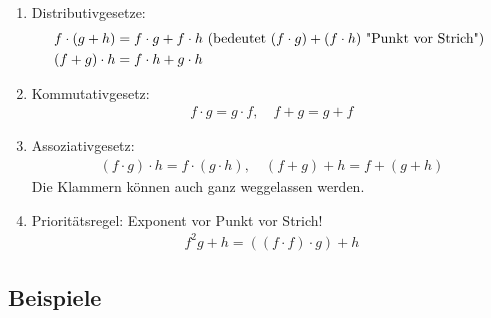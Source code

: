 	\begin{enumerate}
	\item Distributivgesetze:
		\begin{align*}
		f \cdot(g+h)&=f \cdot g + f \cdot h 
		\textnormal{ (bedeutet } (f \cdot g)+(f \cdot h) \textnormal{ "Punkt vor Strich") } \\
		(f+g)\cdot h &= f \cdot h + g \cdot h
		\end{align*}
	
	\item Kommutativgesetz:
		\begin{align*}
		f \cdot g = g \cdot f,\quad f+g=g+f
		\end{align*}
	\item Assoziativgesetz:
		\begin{align*}
		(f \cdot g) \cdot h = f \cdot (g  \cdot h), \quad (f+g)+h=f+(g+h)		
		\end{align*}
		Die Klammern können auch ganz weggelassen werden.
		
	\item Prioritätsregel: \quad Exponent vor Punkt vor Strich!
		\begin{align*}
		f^2g+h= ((f \cdot f) \cdot g)+h
		\end{align*}
	
	\end{enumerate}
	
	
\subsection[Beispiele und Formeln]{Beispiele}

